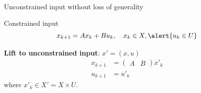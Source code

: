 \begin{frame}{Unconstrained input without loss of generality}
  \begin{block}{\alert{Constrained} input}
    \[ x_{k+1} = A x_k + B u_k, \quad x_k \in X, \alert{u_k \in U} \]
  \end{block}
  \textbf{\alert{Lift} to \alert{un}constrained input}: $x' = (x, u)$
  \begin{align*}
    x_{k+1} & =
    \begin{pmatrix}
      A & B
    \end{pmatrix}
    x'_k\\
    u_{k+1} & =
    u'_k
  \end{align*}
  where $x'_k \in X' = X \times U$.
\end{frame}

